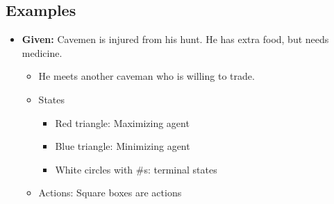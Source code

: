 \subsection{Examples}
\begin{example}
    \begin{itemize}
        \item \textbf{Given:} Cavemen is injured from his hunt. He has extra food, but needs medicine.
        \begin{itemize}
            \item He meets another caveman who is willing to trade. 
        \end{itemize} 
        \vspace{-1.5em}
        \begin{itemize}
            \item States
            \begin{itemize}
                \item Red triangle: Maximizing agent
                \item Blue triangle: Minimizing agent
                \item White circles with \#s: terminal states
            \end{itemize}
            \item Actions: Square boxes are actions
        \end{itemize}
        \vspace{-1.5em}
    \end{itemize}
\end{example}